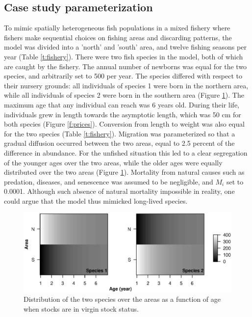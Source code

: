 \documentclass[12pt,oneline,a4paper,numbib]{ouparticle}
\numberwithin{equation}{subsection} %
\begin{document}
\subsection{Case study parameterization}

To mimic spatially heterogeneous fish populations in a mixed fishery where fishers make sequential choices on fishing areas and discarding patterns, the model was divided into a 'north' and 'south' area, and twelve fishing seasons per year (Table \ref{t:fishery}). There were two fish species in the model, both of which are caught by the fishery. The annual number of newborns was equal for the two species, and arbitrarily set to 500 per year. The species differed with respect to their nursery grounds: all individuals of species 1 were born in the northern area, while all individuals of species 2 were born in the southern area (Figure \ref{f:distribution}). The maximum age that any individual can reach was 6 years old. During their life, individuals grew in length towards the asymptotic length, which was 50 cm for both species (Figure \ref{f:prices}). Conversion from length to weight was also equal for the two species (Table \ref{t:fishery}). Migration was parameterized so that a gradual diffusion occurred between the two areas, equal to 2.5 percent of the difference in abundance. For the unfished situation this led to a clear segregation of the younger ages over the two areas, while the older ages were equally distributed over the two areas (Figure \ref{f:distribution}). Mortality from natural causes such as predation, diseases, and senescence was assumed to be negligible, and $M_i$ set to 0.0001. Although such absence of natural mortality impossible in reality, one could argue that the model thus mimicked long-lived species.

\begin{figure}[!ht]
\centering
\includegraphics[width=\textwidth]{Figures/Distributions.eps} 
\caption{Distribution of the two species over the areas as a function of age when stocks are in virgin stock status.}
\label{f:distribution}
\end{figure}
  
\end{document}
